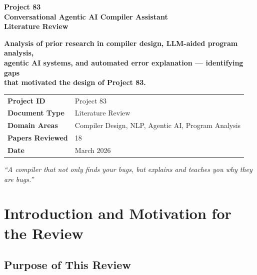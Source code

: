 \documentclass[a4paper,11pt]{article}
\begin{document}

\begin{titlepage}
\centering
\vspace*{2cm}
{\Huge\bfseries\color{blue!70!black} Project 83}\\[6pt]
{\LARGE\bfseries Conversational Agentic AI Compiler Assistant}\\[10pt]
{\Large\bfseries Literature Review}\\[2cm]

\begin{tcolorbox}[colback=blue!5!white, colframe=blue!60!black, width=0.85\textwidth]
\centering
\textbf{Analysis of prior research in compiler design, LLM-aided program analysis,\\ agentic AI systems, and automated error explanation --- identifying gaps\\ that motivated the design of Project 83.}
\end{tcolorbox}

\vspace{1.5cm}
\begin{tabular}{ll}
\toprule
\textbf{Project ID}      & Project 83 \\
\textbf{Document Type}   & Literature Review \\
\textbf{Domain Areas}    & Compiler Design, NLP, Agentic AI, Program Analysis \\
\textbf{Papers Reviewed} & 18 \\
\textbf{Date}            & March 2026 \\
\bottomrule
\end{tabular}

\vfill
{\large\textit{``A compiler that not only finds your bugs, but explains and teaches you why they are bugs.''}}
\end{titlepage}

\tableofcontents
\newpage

\section{Introduction and Motivation for the Review}

\subsection{Purpose of This Review}
\end{document}
